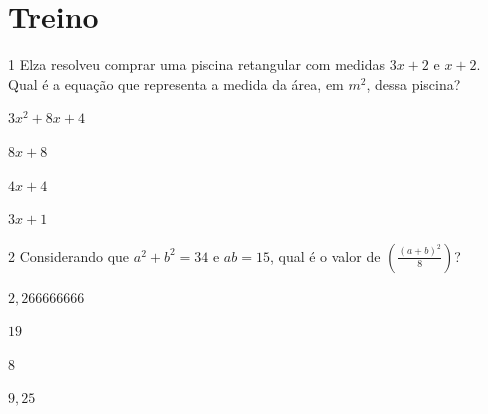 {\section*{Treino}

\num{1} Elza resolveu comprar uma piscina retangular com medidas $3x + 2$ e $x + 2$.
Qual é a equação que representa a medida da área, em $m^2$, dessa piscina?

\begin{escolha}[itemsep=0pt]
\item $3x^2 + 8x + 4$
\item $8x + 8$
\item $4x + 4$
\item $3x + 1$
\end{escolha}












\num{2} Considerando que $a^2+ b^2 = 34$ e $ab= 15$, qual é o valor de
$(\frac{(a + b)^2}{8})$?

\begin{escolha}[itemsep=0pt]
\item $2,266666666$
\item $19$
\item $8$
\item $9,25$
\end{escolha}






}

